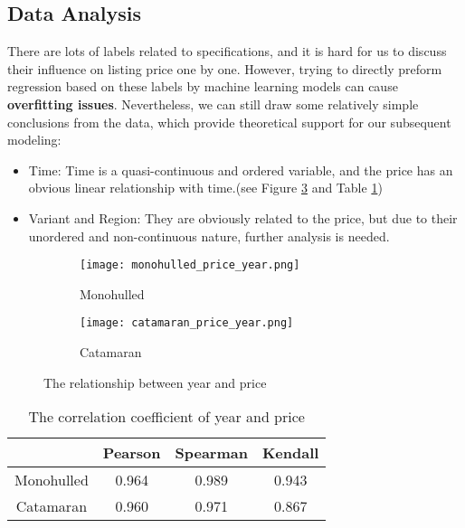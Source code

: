\documentclass[12pt]{article}  %
\begin{document}
\subsection{Data Analysis}
There are lots of labels related to specifications, 
and it is hard for us to discuss their influence on listing price one by one. 
However, trying to directly preform regression based on these labels by machine learning models can cause \textbf{overfitting issues}.
Nevertheless, we can still draw some relatively simple conclusions from the data, which provide theoretical support for our subsequent modeling:
\begin{itemize}
    \item Time: Time is a quasi-continuous and ordered variable, 
    and the price has an obvious linear relationship with time.(see Figure \ref{fig:year_price} and Table \ref{table: correlation_coefficient})
    \item Variant and Region: They are obviously related to the price, but due to their unordered and non-continuous nature, further analysis is needed.
\end{itemize}
\begin{figure}[htbp]
    \centering
    \begin{subfigure}[b]{.4\textwidth}
    \texttt{[image: monohulled\_price\_year.png]}
    \caption{Monohulled}\label{subfig:mono_year}
    \end{subfigure}
    \begin{subfigure}[b]{.4\textwidth}
    \texttt{[image: catamaran\_price\_year.png]}
    \caption{Catamaran}\label{subfig:cata_year}
    \end{subfigure}
    \caption{The relationship between year and price}\label{fig:year_price}
\end{figure} 

\begin{table}[h!]
    \begin{center}
      \begin{tabular}{c|c|c|c}
        & Pearson & Spearman & Kendall\\
        \hline
        \hline
        Monohulled &0.964 & 0.989 & 0.943 \\
        Catamaran  &0.960& 0.971 & 0.867\\
      \end{tabular}
      \caption{The correlation coefficient of year and price}\label{table: correlation_coefficient}
    \end{center}
\end{table}
\end{document}

